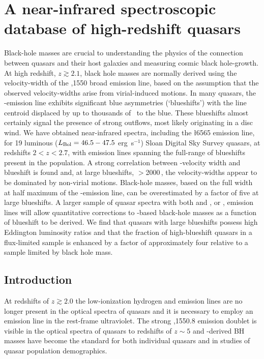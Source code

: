 \chapter{A near-infrared spectroscopic database of high-redshift quasars}\label{ch:chapter02}

Black-hole masses are crucial to understanding the physics of the connection between quasars and their host galaxies and measuring cosmic black hole-growth. 
At high redshift, $z \gtrsim 2.1$, black hole masses are normally derived using the velocity-width of the ,1550 broad emission line, based on the assumption that the observed velocity-widths arise from virial-induced motions.  
In many quasars, the -emission line exhibits significant blue asymmetries (`blueshifts') with the line centroid displaced by up to thousands of \kms\, to the blue. 
These blueshifts almost certainly signal the presence of strong outflows, most likely originating in a disc wind.
We have obtained near-infrared spectra, including the \ha\l6565 emission line, for 19 luminous ($L_{\rm Bol} = 46.5-47.5$ erg~s$^{-1}$) Sloan Digital Sky Survey quasars, at redshifts $2 < z < 2.7$, with  emission lines spanning the full-range of blueshifts present in the population.  
A strong correlation between -velocity width and blueshift is found and, at large blueshifts, $>$2000\,\kms, the velocity-widths appear to be dominated by non-virial motions. 
Black-hole masses, based on the full width at half maximum of the -emission line, can be overestimated by a factor of five at large blueshifts. 
A larger sample of quasar spectra with both  and \hbns, or \hans, emission lines will allow quantitative corrections to -based black-hole masses as a function of blueshift to be derived. 
We find that quasars with large  blueshifts possess high Eddington luminosity ratios and that the fraction of high-blueshift quasars in a flux-limited sample is enhanced by a factor of approximately four relative to a sample limited by black hole mass.    

\section{Introduction}
\label{ch:2-sec:intro}

At redshifts of $z\gtrsim 2.0$ the low-ionization hydrogen and  emission lines are no longer present in the optical spectra of quasars and it is necessary to employ an emission line in the rest-frame ultraviolet.  
The strong ,1550.8 emission doublet is visible in the optical spectra of quasars to redshifts of $z\sim5$ and -derived BH masses have become the standard \citep[e.g.][]{vestergaard06,park13} for both individual quasars and in studies of quasar population demographics.

